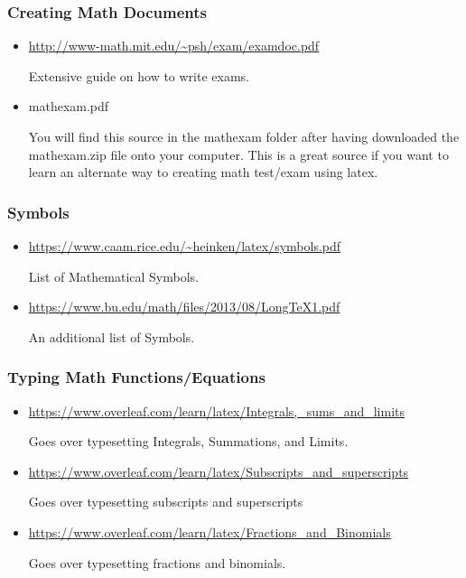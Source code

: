 \documentclass[12pt,hidelinks]{article}
\begin{document}
		\subsubsection{Creating Math Documents}
			\begin{itemize}
				\item \url{http://www-math.mit.edu/~psh/exam/examdoc.pdf}
					\begin{absquote}
						Extensive guide on how to write exams.  
					\end{absquote}
				\item mathexam.pdf
					\begin{absquote}
						You will find this source in the mathexam folder after having downloaded the mathexam.zip file onto your computer. This is a great source if you want to learn an alternate way to creating math test/exam using latex.
					\end{absquote}
			\end{itemize}
		\subsubsection{Symbols}
			\begin{itemize}
				\item \url{https://www.caam.rice.edu/~heinken/latex/symbols.pdf}
					\begin{absquote}
						List of Mathematical Symbols.
					\end{absquote}
				\item \url{https://www.bu.edu/math/files/2013/08/LongTeX1.pdf}
					\begin{absquote}
						An additional list of  Symbols.
					\end{absquote}
			\end{itemize}
		\subsubsection{Typing Math Functions/Equations}
			\begin{itemize}
				\item \url{https://www.overleaf.com/learn/latex/Integrals,_sums_and_limits}
					\begin{absquote}
						Goes over typesetting Integrals, Summations, and Limits.
					\end{absquote}
				\item \url{https://www.overleaf.com/learn/latex/Subscripts_and_superscripts}
					\begin{absquote}
						Goes over typesetting subscripts and superscripts
					\end{absquote}
				\item \url{https://www.overleaf.com/learn/latex/Fractions_and_Binomials}
					\begin{absquote}
						Goes over typesetting fractions and binomials.
					\end{absquote}
			\end{itemize}
\end{document}
